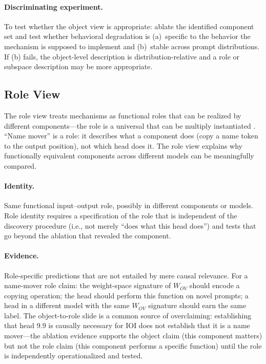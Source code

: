 \documentclass[11pt]{article}
\theoremstyle{remark}
\begin{document}
\paragraph{Discriminating experiment.}
To test whether the object view is appropriate: ablate the identified
component set and test whether behavioral degradation is (a)~specific to
the behavior the mechanism is supposed to implement and (b)~stable across
prompt distributions.  If (b) fails, the object-level description is
distribution-relative and a role or subspace description may be more
appropriate.

\subsection{Role View}

The role view treats mechanisms as functional roles that can be realized
by different components---the role is a universal that can be multiply
instantiated \citep{lewis1986}.  ``Name mover'' is a role: it describes
what a component does (copy a name token to the output position), not
which head does it.  The role view explains why functionally equivalent
components across different models can be meaningfully compared.

\paragraph{Identity.}
Same functional input--output role, possibly in different components or
models.  Role identity requires a specification of the role that is
independent of the discovery procedure (i.e., not merely ``does what
this head does'') and tests that go beyond the ablation that revealed
the component.

\paragraph{Evidence.}
Role-specific predictions that are not entailed by mere causal relevance.
For a name-mover role claim: the weight-space signature of $W_{OV}$
should encode a copying operation; the head should perform this function
on novel prompts; a head in a different model with the same $W_{OV}$
signature should earn the same label.  The object-to-role slide is
a common source of overclaiming: establishing
that head 9.9 is causally necessary for IOI does not establish that it
is a name mover---the ablation evidence supports the object claim
(this component matters) but not the role claim (this component performs
a specific function) until the role is independently operationalized
and tested.
\end{document}

